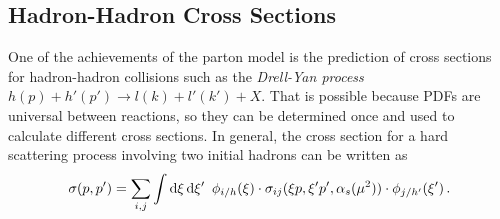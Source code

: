 %
\subsection{Hadron-Hadron Cross Sections}
One of the achievements of the parton model is the prediction of cross sections for hadron-hadron collisions such as the \textit{Drell-Yan process} $h(p) +  h'(p') \rightarrow l(k) + l'(k') + X$.
That is possible because PDFs are universal between reactions, so they can be determined once and used to calculate different cross sections.
In general, the cross section for a hard scattering process involving two initial hadrons can be written as
%
\begin{equation}
	\sigma(p,p') = \sum_{i,j} \int \dif \xi \dif \xi' \enspace \phi_{i/h}(\xi) \cdot \sigma_{ij}(\xi p,\xi' p',\alpha_s(\mu^2)) \cdot \phi_{j/h'}(\xi') \, .
\end{equation}
%

